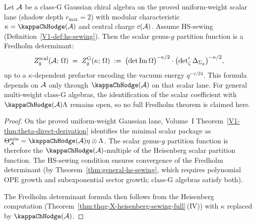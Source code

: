 \begin{theorem}%
%
%
Let $\mathcal{A}$ be a class-G Gaussian chiral algebra on the proved
uniform-weight scalar lane
\textup{(}shadow depth $r_{\max} = 2$\textup{)} with
modular characteristic $\kappa = \kappaChHodge(\cA)$ and central
charge $c(\mathcal{A})$. Assume HS-sewing
\textup{(}Definition~\textup{\ref{V1-def:hs-sewing}}\textup{)}.
Then the scalar genus-$g$ partition function is a Fredholm
determinant:
\begin{equation}%
Z_g^{\mathrm{scal}}(\cA;\,\Omega)
\;=\;
Z_g^{\mathrm{G}}(\kappa;\,\Omega)
\;:=\;
\bigl(\det\operatorname{Im}\Omega\bigr)^{-\kappa/2}
\cdot
\bigl(\zetareg\Delta_{\Sigma_g}\bigr)^{-\kappa/2},
\end{equation}
up to a $\kappa$-dependent prefactor encoding the vacuum energy
$q^{-c/24}$. This formula depends on $\mathcal{A}$ only through
$\kappaChHodge(\cA)$ on that scalar lane. For general multi-weight
class-G algebras, the identification of the scalar coefficient with
$\kappaChHodge(\cA)\Lambda$ remains open, so no full Fredholm theorem is
claimed here.
\end{theorem}

\begin{proof}
On the proved uniform-weight Gaussian lane, Volume~I
Theorem~\ref{V1-thm:theta-direct-derivation} identifies the minimal
scalar package as
$\Theta_\cA^{\min} = \kappaChHodge(\cA)\eta\otimes\Lambda$.
The scalar genus-$g$ partition function is therefore the
$\kappaChHodge(\cA)$-multiple of the Heisenberg scalar partition function.
The HS-sewing condition ensures convergence of the Fredholm
determinant (by Theorem~\ref{thm:general-hs-sewing}, which
requires polynomial OPE growth and subexponential sector growth;
class-G algebras satisfy both).

The Fredholm determinant formula then follows from the
Heisenberg computation
(Theorem~\ref{thm:thqg-X-heisenberg-sewing-full}\,(IV))
with $\kappa$ replaced by $\kappaChHodge(\cA)$.
\end{proof}


